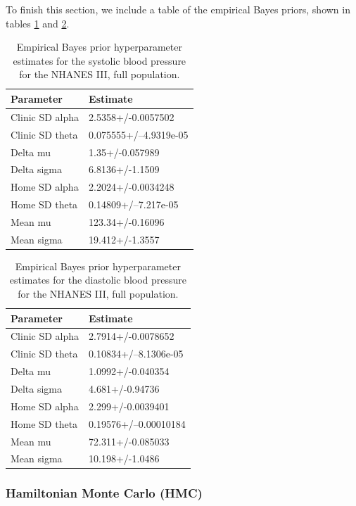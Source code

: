 \documentclass[
]{article}
\begin{document}
To finish this section, we include a table of the empirical Bayes priors, shown in tables \ref{tab:empestsS} and \ref{tab:empestsD}.

\begin{table}

\caption{\label{tab:empestsS}Empirical Bayes prior hyperparameter estimates for the systolic blood pressure for the NHANES III, full population.}
\centering
\begin{tabular}[t]{ll}
\toprule
Parameter & Estimate\\
\midrule
Clinic SD alpha & 2.5358+/-0.0057502\\
Clinic SD theta & 0.075555+/--4.9319e-05\\
Delta mu & 1.35+/-0.057989\\
Delta sigma & 6.8136+/-1.1509\\
Home SD alpha & 2.2024+/-0.0034248\\
\addlinespace
Home SD theta & 0.14809+/--7.217e-05\\
Mean mu & 123.34+/-0.16096\\
Mean sigma & 19.412+/-1.3557\\
\bottomrule
\end{tabular}
\end{table}

\begin{table}

\caption{\label{tab:empestsD}Empirical Bayes prior hyperparameter estimates for the diastolic blood pressure for the NHANES III, full population.}
\centering
\begin{tabular}[t]{ll}
\toprule
Parameter & Estimate\\
\midrule
Clinic SD alpha & 2.7914+/-0.0078652\\
Clinic SD theta & 0.10834+/--8.1306e-05\\
Delta mu & 1.0992+/-0.040354\\
Delta sigma & 4.681+/-0.94736\\
Home SD alpha & 2.299+/-0.0039401\\
\addlinespace
Home SD theta & 0.19576+/--0.00010184\\
Mean mu & 72.311+/-0.085033\\
Mean sigma & 10.198+/-1.0486\\
\bottomrule
\end{tabular}
\end{table}

\hypertarget{hamiltonian-monte-carlo-hmc}{%
\subsubsection{Hamiltonian Monte Carlo (HMC)}\label{hamiltonian-monte-carlo-hmc}}
\end{document}
